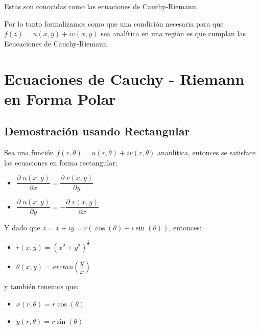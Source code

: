 \documentclass[12pt, fleqn]{report}                             %
\newcommand{\Wrap}[1]{\left( #1 \right)}                        %
\newcommand{\pfrac}[2]{\Wrap{\dfrac{#1}{#2}}}                   %
\newcommand{\Cos}[1]{\cos\Wrap{#1}}                             %
\newcommand{\Sin}[1]{\sin\Wrap{#1}}                             %
\newcommand \Cis[1]  {\Cos{#1} + i \Sin{#1}}                    %
\newcommand \Partial[2]                                        %
        {\dfrac{\partial \; #1}{\partial #2}}                      %
\begin{document}
            Estas son conocidas como las ecuaciones de Cauchy-Riemann.

            Por lo tanto formalizamos como que una condición necesaria para que
            $f(z) = u(x, y) + iv (x, y)$ sea analítica en una región es que cumplan
            las Ecucaciones de Cauchy-Riemann.


        \clearpage
        \section{Ecuaciones de Cauchy - Riemann en Forma Polar}

            \subsection{Demostración usando Rectangular}

                Sea una función $f(r, \theta) = u(r, \theta) + iv(r, \theta)$ ananlítica,
                entonces se satisface las ecuaciones en forma rectangular:

                \begin{itemize}
                    \item $\Partial{u(x, y)}{x} =   \Partial{v(x, y)}{y}$
                    \item $\Partial{u(x, y)}{y} = - \Partial{v(x, y)}{x}$
                \end{itemize}

                Y dado que $z = x + iy = r(\Cis{\theta})$, entonces:
                \begin{itemize}
                    \item $r(x, y) = \Wrap{x^2 + y^2}^{\frac{1}{2}}$
                    \item $\theta(x, y) = arctan\pfrac{y}{x}$
                \end{itemize}  

                y también tenemos que:
                \begin{itemize}
                    \item $x(r, \theta) = r\Cos{\theta}$
                    \item $y(r, \theta) = r\Sin{\theta}$
                \end{itemize}
\end{document}
